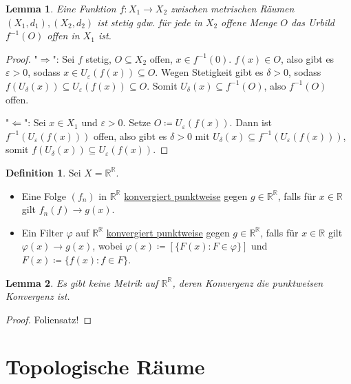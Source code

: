 \documentclass[12pt]{scrartcl}%
\newtheorem{lemma}{Lemma}
\theoremstyle{definition}
\newtheorem*{defn}{Definition}
\theoremstyle{remark}
\newcommand\Inv[1]{#1^{-1}}
\begin{document}
\begin{lemma}
    Eine Funktion $f: X_1\to X_2$ zwischen metrischen Räumen $(X_1, d_1), (X_2, d_2)$ ist stetig gdw. für jede in $X_2$ offene Menge $O$ das Urbild $\Inv f(O)$ offen in $X_1$ ist.
\end{lemma}

\begin{proof}
    "$\Rightarrow$": Sei $f$ stetig, $O \subseteq X_2$ offen, $x\in \Inv f(0)$. $f(x)\in O$, also gibt es $\varepsilon > 0$, sodass $x\in U_\varepsilon(f(x)) \subseteq O$. Wegen Stetigkeit gibt es $\delta > 0$, sodass $f(U_\delta(x))\subseteq U_\varepsilon(f(x)) \subseteq O$. Somit $U_\delta(x)\subseteq \Inv f(O)$, also $\Inv f(O)$ offen.

    "$\Leftarrow$": Sei $x\in X_1$ und $\varepsilon > 0$. Setze $O\coloneqq U_\varepsilon(f(x))$. Dann ist $\Inv f(U_\varepsilon(f(x)))$ offen, also gibt es $\delta > 0$ mit $U_\delta(x) \subseteq \Inv f(U_\varepsilon(f(x)))$, somit $f(U_\delta(x)) \subseteq U_\varepsilon(f(x))$.
\end{proof}

\begin{defn}
    Sei $X=\mathbb{R}^\mathbb{R}$. 
    
    \begin{itemize}
        \item Eine Folge $(f_n)$ in $\mathbb{R}^\mathbb{R}$ \underline{konvergiert punktweise} gegen $g\in \mathbb{R}^\mathbb{R}$, falls für $x\in \mathbb{R}$ gilt $f_n(f)\to g(x)$.
        \item Ein Filter $\varphi$ auf $\mathbb{R}^\mathbb{R}$ \underline{konvergiert punktweise} gegen $g\in \mathbb{R}^\mathbb{R}$, falls für $x\in \mathbb{R}$ gilt $\varphi(x)\to g(x)$, wobei $\varphi(x)\coloneqq [\{F(x): F\in\varphi\}]$ und $F(x)\coloneqq \{f(x): f\in F\}$.
    \end{itemize}
\end{defn}

\begin{lemma}
    Es gibt keine Metrik auf $\mathbb{R}^\mathbb{R}$, deren Konvergenz die punktweisen Konvergenz ist.
\end{lemma}

\begin{proof}
    Foliensatz!
\end{proof}

\section*{Topologische Räume}
\end{document}
